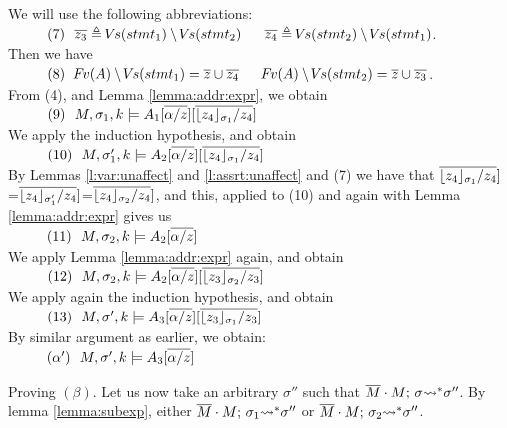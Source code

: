 \begin{description}
We will use the following abbreviations: \\
$\SPS (7)\ \ \overline {z_3}\triangleq\vs(stmt_1)\setminus\vs(stmt_2) \ \ \ \ \ \overline {z_4}\triangleq\vs(stmt_2)\setminus\vs(stmt_1) $.\\
Then we have\\
$\SPS  (8)\ \ \fv(A)\setminus\vs(stmt_1) = \overline {z}\cup \overline{z_4}  \ \ \ \ \ 
\fv(A)\setminus\vs(stmt_2) = \overline {z}\cup\overline{z_3} $.
\\
 From (4), and Lemma \ref{lemma:addr:expr}, we obtain\\ 
 $\SPS (9) \ \ \satDAssertFrom M  {\sigma_1} k   {A_1[\overline{\alpha/z}][\overline{{\interpret {\sigma_1} {z_4}} /z_4}]}$\\
 We apply the induction hypothesis, and obtain\\
  $\SPS (10) \ \ \satDAssertFrom M  {\sigma_1'} k   {A_2[\overline{\alpha/z}][\overline{{\interpret {\sigma_1} {z_4}} /z_4}]}$\\
By Lemmas \ref{l:var:unaffect} and \ref{l:assrt:unaffect} and (7) we have that ${\overline{{\interpret {\sigma_1} {z_4}} /z_4}]}$=${\overline{{\interpret {\sigma_1'} {z_4}} /z_4}]}$=${\overline{{\interpret {\sigma_2} {z_4}} /z_4}]}$, and this, applied to (10) and again with Lemma \ref{lemma:addr:expr} gives us\\
 $\SPS (11) \ \ \satDAssertFrom M  {\sigma_2} k   {A_2[\overline{\alpha/z}]}$\\
We apply Lemma \ref{lemma:addr:expr} again, and obtain\\
 $\SPS (12) \ \ \satDAssertFrom M  {\sigma_2} k   {A_2[\overline{\alpha/z}][{\overline{{\interpret {\sigma_2} {z_3}} /z_3}}]}$\\
 We apply again the induction hypothesis, and obtain\\
  $\SPS (13) \ \ \satDAssertFrom M  {\sigma'} k   {A_3[\overline{\alpha/z}][\overline{{\interpret {\sigma_1} {z_3}} /z_3}]}$\\
By similar argument as earlier, we obtain:\\
 $\SPS (\alpha') \ \ \satDAssertFrom M  {\sigma'} k   {A_3[\overline{\alpha/z}]}$ 
 
 \vspace{.1cm}
Proving $(\beta)$.
Let us now take an arbitrary $\sigma''$ such that   $\leadstoBoundedStar  {\Mtwo\cdot M}  {\sigma}  {\sigma''}$. By
lemma  \ref{lemma:subexp}, either $\leadstoBoundedStar  {\Mtwo\cdot M}  {\sigma_1}  {\sigma''}$ or
$\leadstoBoundedStar  {\Mtwo\cdot M}  {\sigma_2}  {\sigma''}$. 


\end{description}
